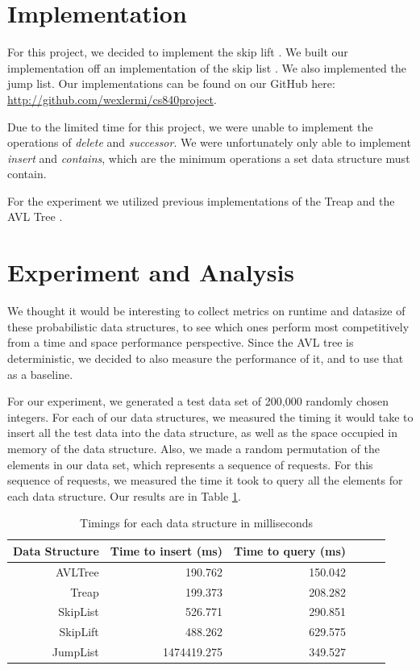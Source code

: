 \documentclass[oribibl]{llncs}
\begin{document}
\section{Implementation}
\label{sctn:implementation}

For this project, we decided to implement the skip lift \cite{skip_lift}. We built our implementation off an implementation of the skip list \cite{skip_list_imp}. We also implemented the jump list\cite{jump_list}.  Our implementations can be found on our GitHub here: \url{http://github.com/wexlermi/cs840project}.

Due to the limited time for this project, we were unable to implement the operations of {\it delete} and {\it successor}. We were unfortunately only able to implement {\it insert} and {\it contains}, which are the minimum operations a set data structure must contain.

For the experiment we utilized previous implementations of the Treap \cite{treap_imp} and the AVL Tree \cite{avl_tree_imp}.

 \section{Experiment and Analysis}
\label{sctn:experiment}

We thought it would be interesting to collect metrics on runtime and datasize of these probabilistic data structures, to see which ones perform most competitively from a time and space performance perspective. Since the AVL tree is deterministic, we decided to also measure the performance of it, and to use that as a baseline.

For our experiment, we generated a test data set of 200,000 randomly chosen integers. For each of our data structures, we measured the timing it would take to insert all the test data into the data structure, as well as the space occupied in memory of the data structure. Also, we made a random permutation of the elements in our data set, which represents a sequence of requests. For this sequence of requests, we measured the time it took to query all the elements for each data structure. Our results are in Table \ref{table:timings}.


\begin{table}[htbp]
\caption{Timings for each data structure in milliseconds}
\begin{center}
\begin{tabular}{|r|r|r|r|r|r|}
\hline
Data Structure & Time to insert (ms) & Time to query (ms) \\ \hline
AVLTree & 190.762 & 150.042 \\ \hline
Treap &  199.373 & 208.282 \\ \hline
SkipList & 526.771 & 290.851 \\ \hline
SkipLift & 488.262 & 629.575  \\ \hline
JumpList & 1474419.275 & 349.527 \\ \hline
\end{tabular}
\end{center}
\label{table:timings}
\end{table}
\end{document}
